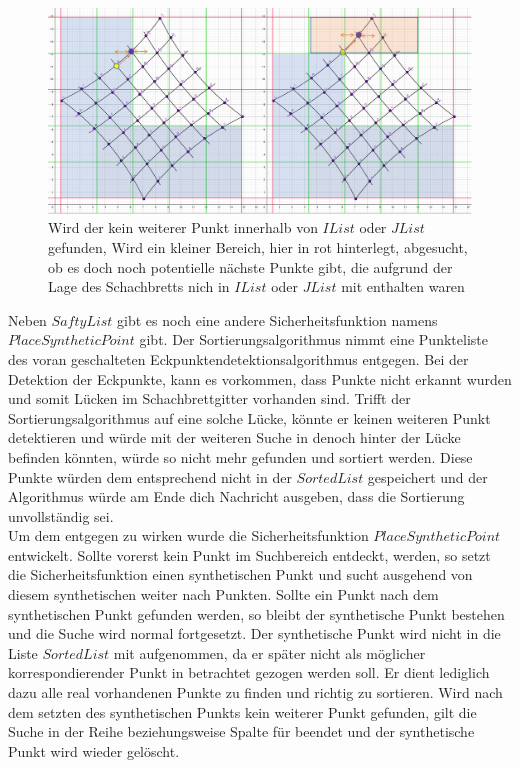\begin{figure}[!htb]
	\centering
	\includegraphics[width=0.8\linewidth]{images/VerzeichnetesSchachbrett_6.png}
	\caption[Sicherheitsfunktion $SaftyList$]{Wird der kein weiterer Punkt innerhalb von $IList$ oder $JList$ gefunden, Wird ein kleiner Bereich, hier in rot hinterlegt, abgesucht, ob es doch noch potentielle nächste Punkte gibt, die aufgrund der Lage des Schachbretts nich in $IList$ oder $JList$ mit enthalten waren}
	\label{fig:SaftyList}
\end{figure}


Neben $SaftyList$ gibt es noch eine andere Sicherheitsfunktion namens $PlaceSyntheticPoint$ gibt. Der Sortierungsalgorithmus nimmt eine Punkteliste des voran geschalteten Eckpunktendetektionsalgorithmus entgegen. Bei der Detektion der Eckpunkte, kann es vorkommen, dass Punkte nicht erkannt wurden und somit Lücken im Schachbrettgitter vorhanden sind. Trifft der Sortierungsalgorithmus auf eine solche Lücke, könnte er keinen weiteren Punkt detektieren und würde mit der weiteren Suche in denoch hinter der Lücke befinden könnten, würde so nicht mehr gefunden und sortiert werden. Diese Punkte würden dem entsprechend nicht in der $SortedList$ gespeichert und der Algorithmus würde am Ende dich Nachricht ausgeben, dass die Sortierung unvollständig sei.\\

Um dem entgegen zu wirken wurde die Sicherheitsfunktion $PlaceSyntheticPoint$ entwickelt. Sollte vorerst kein Punkt im Suchbereich entdeckt, werden, so setzt die Sicherheitsfunktion einen synthetischen Punkt und sucht ausgehend von diesem synthetischen weiter nach Punkten. Sollte ein Punkt nach dem synthetischen Punkt gefunden werden, so bleibt der synthetische Punkt bestehen und die Suche wird normal fortgesetzt. Der synthetische Punkt wird nicht in die Liste $SortedList$ mit aufgenommen, da er später nicht als möglicher korrespondierender Punkt in betrachtet gezogen werden soll. Er dient lediglich dazu alle real vorhandenen Punkte zu finden und richtig zu sortieren.
Wird nach dem setzten des synthetischen Punkts kein weiterer Punkt gefunden, gilt die Suche in der Reihe beziehungsweise Spalte für beendet und der synthetische Punkt wird wieder gelöscht. \\

